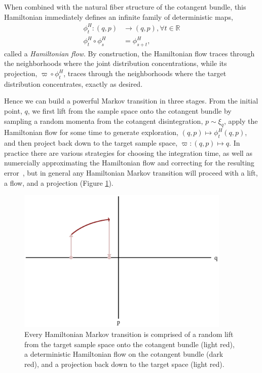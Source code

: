\documentclass[stslayout]{imsart}
\begin{document}
When combined with the natural fiber structure of the cotangent bundle,
this Hamiltonian immediately defines an infinite family of deterministic 
maps,
%
\begin{align*}
\phi^{H}_{t} : (q, p) &\rightarrow (q, p), \forall t \in \mathbb{R}
\\
\phi^{H}_{t} \circ \phi^{H}_{s} &= \phi^{H}_{s + t},
\end{align*}
%
called a \emph{Hamiltonian flow}.  By construction, the Hamiltonian
flow traces through the neighborhoods where the joint distribution
concentrations, while its projection, $\varpi \circ \phi_{t}^{H}$, 
traces through the neighborhoods where the target distribution
concentrates, exactly as desired.

Hence we can build a powerful Markov transition in three stages.
From the initial point, $q$, we first lift from the sample space onto 
the cotangent bundle by sampling a random momenta from the 
cotangent disintegration, $p \sim \xi_{q}$, apply the Hamiltonian flow 
for some time to generate exploration, $(q, p) \mapsto \phi^{H}_{t} (q, p)$, 
and then project back down to the target sample space, 
$\varpi : (q, p) \mapsto q$.  In practice there are various strategies for 
choosing the integration time, as well as numercially approximating 
the Hamiltonian flow and correcting for the resulting 
error~\citep{Betancourt:2016}, but in general any Hamiltonian Markov 
transition will proceed with a lift, a flow, and a projection (Figure
\ref{fig:hmc_transition_cartoon}).

\begin{figure}
\centering
\includegraphics[width=4in]{hmc_transition_cartoon.eps}
\caption{Every Hamiltonian Markov transition is comprised of a random
lift from the target sample space onto the cotangent bundle (light red), a 
deterministic Hamiltonian flow on the cotangent bundle (dark red), 
and a projection back down to the target space (light red).}
\label{fig:hmc_transition_cartoon}
\end{figure}
\end{document}
